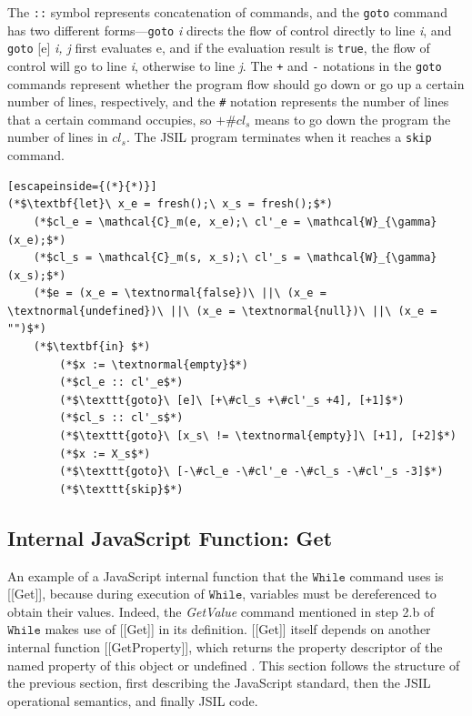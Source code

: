 \documentclass[a4paper,11pt,twoside]{report}
\begin{document}
The \texttt{::} symbol represents concatenation of commands, and the \texttt{goto} command  has two different forms---\texttt{goto} \textit{i} directs the flow of control directly to line \textit{i}, and \texttt{goto} [e] \textit{i, j} first evaluates e, and if the evaluation result is \texttt{true}, the flow of control will go to line \textit{i}, otherwise to line \textit{j}. The \texttt{+} and \texttt{-} notations in the \texttt{goto} commands represent whether the program flow should go down or go up a certain number of lines, respectively, and the \texttt{\#} notation represents the number of lines that a certain command occupies, so $+\#cl_s$ means to go down the program the number of lines in $cl_s$. The JSIL program terminates when it reaches a \texttt{skip} command.
\begin{center}
\begin{minipage}{10cm}
\begin{lstlisting}[escapeinside={(*}{*)}]
(*$\textbf{let}\ x_e = fresh();\ x_s = fresh();$*)
    (*$cl_e = \mathcal{C}_m(e, x_e);\ cl'_e = \mathcal{W}_{\gamma} (x_e);$*)
    (*$cl_s = \mathcal{C}_m(s, x_s);\ cl'_s = \mathcal{W}_{\gamma}(x_s);$*)
    (*$e = (x_e = \textnormal{false})\ ||\ (x_e = \textnormal{undefined})\ ||\ (x_e = \textnormal{null})\ ||\ (x_e = "")$*)
    (*$\textbf{in} $*)
        (*$x := \textnormal{empty}$*)
        (*$cl_e :: cl'_e$*)
        (*$\texttt{goto}\ [e]\ [+\#cl_s +\#cl'_s +4], [+1]$*)
        (*$cl_s :: cl'_s$*)
        (*$\texttt{goto}\ [x_s\ != \textnormal{empty}]\ [+1], [+2]$*)
        (*$x := X_s$*)
        (*$\texttt{goto}\ [-\#cl_e -\#cl'_e -\#cl_s -\#cl'_s -3]$*)
        (*$\texttt{skip}$*)
\end{lstlisting}
\end{minipage}
\end{center}

\subsection{Internal JavaScript Function: Get}\label{sec:get}
An example of a JavaScript internal function that the $\mathtt{While}$ command uses is [[Get]], because during execution of $\mathtt{While}$, variables must be dereferenced to obtain their values. Indeed, the \textit{GetValue} command mentioned in step 2.b of $\mathtt{While}$ makes use of [[Get]] in its definition. [[Get]] itself depends on another internal function [[GetProperty]], which returns the property descriptor of the named property of this object or undefined \cite{EcmaScript}. This section follows the structure of the previous section, first describing the JavaScript standard, then the JSIL operational semantics, and finally JSIL code.
\end{document}
